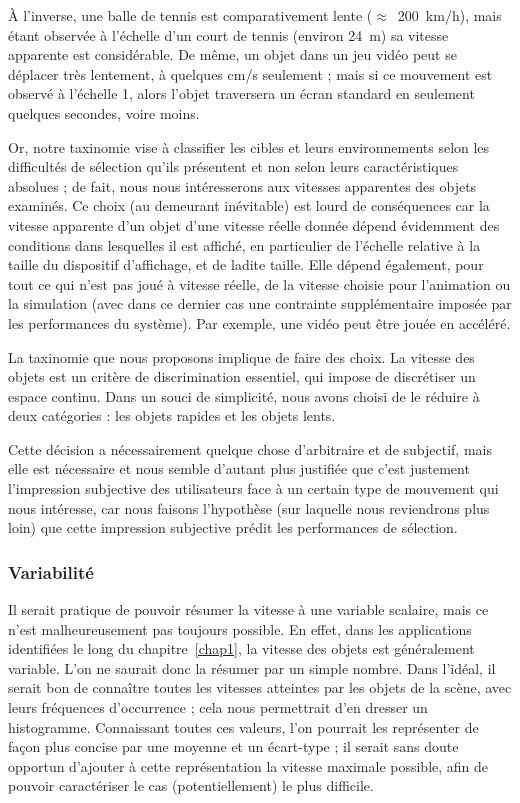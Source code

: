 	À l'inverse, une balle de tennis est comparativement lente ($\approx$~200~km/h), mais étant observée à l'échelle d'un court de tennis (environ 24~m) sa vitesse apparente est considérable. De même, un objet dans un jeu vidéo peut se déplacer très lentement, à quelques cm/s seulement ; mais si ce mouvement est observé à l'échelle 1, alors l'objet traversera un écran standard en seulement quelques secondes, voire moins.
	
	Or, notre taxinomie vise à classifier les cibles et leurs environnements selon les difficultés de sélection qu'ils présentent et non selon leurs caractéristiques absolues ; de fait, nous nous intéresserons aux vitesses apparentes des objets examinés. Ce choix (au demeurant inévitable) est lourd de conséquences car la vitesse apparente d'un objet d'une vitesse réelle donnée dépend évidemment des conditions dans lesquelles il est affiché, en particulier de l'échelle relative à la taille du dispositif d'affichage, et de ladite taille. Elle dépend également, pour tout ce qui n'est pas joué à vitesse réelle, de la vitesse choisie pour l'animation ou la simulation (avec dans ce dernier cas une contrainte supplémentaire imposée par les performances du système). Par exemple, une vidéo peut être jouée en accéléré.
	
	La taxinomie que nous proposons implique de faire des choix. La vitesse des objets est un critère de discrimination essentiel, qui impose de discrétiser un espace continu. Dans un souci de simplicité, nous avons choisi de le réduire à deux catégories : les objets rapides et les objets lents.
	
	Cette décision a nécessairement quelque chose d'arbitraire et de subjectif, mais elle est nécessaire et nous semble d'autant plus justifiée que c'est justement l'impression subjective des utilisateurs face à un certain type de mouvement qui nous intéresse, car nous faisons l'hypothèse (sur laquelle nous reviendrons plus loin) que cette impression subjective prédit les performances de sélection.
	
	\subsubsection{Variabilité}
	Il serait pratique de pouvoir résumer la vitesse à une variable scalaire, mais ce n'est malheureusement pas toujours possible. En effet, dans les applications identifiées le long du chapitre~\ref{chap1}, la vitesse des objets est généralement variable. L'on ne saurait donc la résumer par un simple nombre. Dans l'idéal, il serait bon de connaître toutes les vitesses atteintes par les objets de la scène, avec leurs fréquences d'occurrence ; cela nous permettrait d'en dresser un histogramme. Connaissant toutes ces valeurs, l'on pourrait les représenter de façon plus concise par une moyenne et un écart-type ; il serait sans doute opportun d'ajouter à cette représentation la vitesse maximale possible, afin de pouvoir caractériser le cas (potentiellement) le plus difficile.
	

